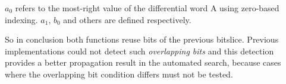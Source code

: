 $a_0$ refers to the most-right value of the differential word A using zero-based indexing. $a_1$, $b_0$ and others are defined respectively.

So in conclusion both functions reuse bits of the previous bitslice. Previous implementations could not detect such \emph{overlapping bits} and this detection provides a better propagation result in the automated search, because cases where the overlapping bit condition differs must not be tested.

%


